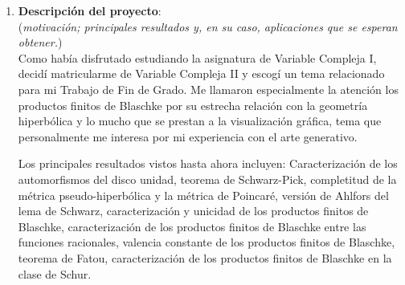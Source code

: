 \documentclass[a4paper,oneside,11pt,leqno]{article}
\begin{document}
\begin{enumerate}[label=\textbf{\arabic*.}]
\begin{itemize}
    \item \textbf{Productos finitos de Blaschke.} Definici\'on y primeras propiedades. Unicidad y no unicidad: teorema de Horowitz-Rubel. Productos finitos de Blaschke vistos como funciones racionales. Su derivada en la circunferencia unidad. Recubrimiento del plano extendido por los productos de Blaschke finitos. \'Algebra del disco, elementos unimodulares, teorema de Fatou para productos de Blaschke finitos. Valencia constante. Composici\'on de productos finitos de Blaschke.
    
    \item \textbf{Aproximaci\'on por productos finitos de Blaschke.} Convergencia uniforme en compactos. Teoremas de Weierstrass y de Hurwitz. Teorema de aproximaci\'on de Carath\'eodory. Cierre de la envoltura convexa de los productos finitos de Blaschke: teorema de Fisher. Aproximaci\'on de funciones unimodulares continuas: teorema de Helson-Sarason. Generalizaci\'on del teorema de Rouch\'e.
    
    \item \textit{Algunos temas adicionales, si el tiempo lo permite.} Teorema de Gauss-Lucas y su an\'alogo para productos finitos de Blaschke. Puntos cr\'iticos. Teorema de interpolaci\'on de Pick-Nevanlinna. Productos infinitos de Blaschke: convergencia y propiedades b\'asicas.
\end{itemize}

\vskip 20pt
\hrule
\item {\bf Descripci\'on del proyecto}: \\
{\small (\textit{motivaci\'on; principales resultados y, en su caso, aplicaciones que se esperan obtener.})} \\

Como hab\'ia disfrutado estudiando la asignatura de Variable Compleja I, decid\'i matricularme de Variable Compleja II y escog\'i un tema relacionado para mi Trabajo de Fin de Grado. Me llamaron especialmente la atenci\'on los productos finitos de Blaschke por su estrecha relaci\'on con la geometr\'ia hiperb\'olica y lo mucho que se prestan a la visualizaci\'on gr\'afica, tema que personalmente me interesa por mi experiencia con el arte generativo.

Los principales resultados vistos hasta ahora incluyen: Caracterizaci\'on de los automorfismos del disco unidad, teorema de Schwarz-Pick, completitud de la m\'etrica pseudo-hiperb\'olica y la m\'etrica de Poincar\'e, versi\'on de Ahlfors del lema de Schwarz, caracterizaci\'on y unicidad de los productos finitos de Blaschke, caracterizaci\'on de los productos finitos de Blaschke entre las funciones racionales, valencia constante de los productos finitos de Blaschke, teorema de Fatou, caracterizaci\'on de los productos finitos de Blaschke en la clase de Schur.


\end{enumerate}
\end{document}
